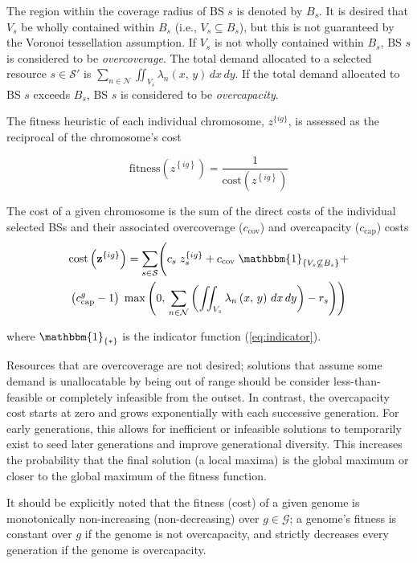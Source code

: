 \documentclass[12pt,dvipsnames]{report}
\newcommand{\ind}[1]{\mathbbm{1}_{\left\{ #1 \right\}}}
\begin{document}
The region within the coverage radius of BS $s$ is denoted by $B_s$.  It is desired that $V_s$ be wholly contained within $B_s$ (i.e., $V_s \subseteq B_s$), but this is not guaranteed by the Voronoi tessellation assumption.  If $V_s$ is not wholly contained within $B_s$, BS $s$ is considered to be \emph{overcoverage}.  The total demand allocated to a selected resource $s \in \mathcal{S}'$ is $\sum_{n \in \mathcal{N}} \iint_{V_s} \lambda_n \left( x,\, y \right) \,dx \,dy$.  If the total demand allocated to BS $s$ exceeds $B_s$, BS $s$ is considered to be \emph{overcapacity}.

The fitness heuristic of each individual chromosome, $z^{\{ig\}}$, is assessed as the reciprocal of the chromosome's cost

\begin{equation} \label{eq:GAFit}
\mathrm{fitness}\left( z^{\left\{ ig \right\}} \right) = \frac{1}{\mathrm{cost}\left( z^{\left\{ ig \right\}} \right)}
\end{equation}

The cost of a given chromosome is the sum of the direct costs of the individual selected BSs and their associated overcoverage ($c_{\text{cov}}$) and overcapacity ($c_{\text{cap}}$) costs
\begin{multline} \label{eq:GACost}
\mathrm{cost}\left( \textbf{z}^{\left\{ ig \right\}} \right) = \sum_{s \in \mathcal{S}} \Biggl( c_s \; z_s^{\left\{ ig \right\}} + c_\text{cov} \; \ind{V_s \not\subseteq B_s} + \\ \left( c_\text{cap}^g - 1 \right) \; \max\left( 0,\, \sum_{n \in \mathcal{N}} \left( \iint_{V_s} \lambda_n\left( x,\, y \right)\, dx\, dy \right) - r_s \right) \Biggr)
\end{multline}

\noindent where $\ind{*}$ is the indicator function (\cref{eq:indicator}).

Resources that are overcoverage are not desired; solutions that assume some demand is unallocatable by being out of range should be consider less-than-feasible or completely infeasible from the outset.  In contrast, the overcapacity cost starts at zero and grows exponentially with each successive generation.  For early generations, this allows for inefficient or infeasible solutions to temporarily exist to seed later generations and improve generational diversity.  This increases the probability that the final solution (a local maxima) is the global maximum or closer to the global maximum of the fitness function.

It should be explicitly noted that the fitness (cost) of a given genome is monotonically non-increasing (non-decreasing) over $g \in \mathcal{G}$; a genome's fitness is constant over $g$ if the genome is not overcapacity, and strictly decreases every generation if the genome is overcapacity.
\end{document}

